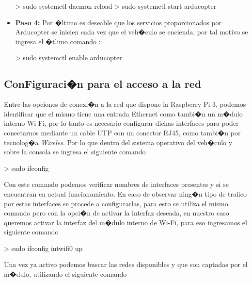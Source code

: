 \begin{itemize}
				\begin{listing}[style=consola, numbers=none]
				> sudo systemctl daemon-reload
				> sudo systemctl start arducopter 
				\end{listing}
				
				
				
				
				\item \textbf{Paso 4:} Por �ltimo es deseable que los servicios proporcionados por Arducopter se inicien cada vez que el veh�culo se encienda, por tal motivo se ingresa el �tlimo comando :
				
				\begin{listing}[style=consola, numbers=none]
				> sudo systemctl enable arducopter 
				\end{listing}
			
			
			
		\end{itemize}

	\subsection{ConFiguraci�n para el acceso a la red}

		\par Entre las opciones de conexi�n a la red que dispone la Raspberry Pi 3, podemos identificar que el mismo tiene una entrada Ethernet como tambi�n un m�dulo interno Wi-Fi, por lo tanto es necesario configurar dichas interfaces para poder conectarnos mediante un cable UTP con un conector RJ45, como tambi�n por tecnolog�a \textit{Wireles}. Por lo que dentro del sistema operativo del veh�culo y sobre la consola se ingresa el siguiente comando 
		\begin{listing}[style=consola, numbers=none]
			> sudo ifconfig
		\end{listing}
		Con este comando podemos verificar nombres de interfaces presentes y si se encuentran en actual funcionamiento. En caso de observar ning�n tipo de trafico por estas interfaces se procede a configurarlas, para esto se utiliza el mismo comando pero con la opci�n de activar la interfaz deseada, en nuestro caso queremos activar la interfaz del m�dulo interno de Wi-Fi, para eso ingresamos el siguiente comando 
		\begin{listing}[style=consola, numbers=none]
		> sudo ifconfig intwifi0 up
		\end{listing}
		Una vez ya activo podemos buscar las redes disponibles y que son captadas por el m�dulo, utilizando el siguiente comando 
		
